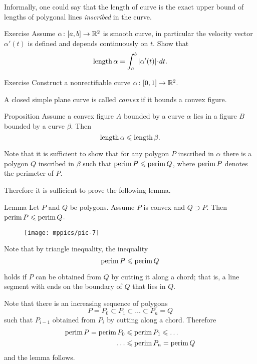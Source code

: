 Informally, one could say that the length of curve is the exact upper bound of lengths of polygonal lines \emph{inscribed} in the curve.

\begin{thm}{Exercise}
Assume $\alpha\colon[a,b]\to\mathbb{R}^2$ is smooth curve, in particular the velocity vector $\alpha'(t)$ is defined and depends continuously on $t$.
Show that
\[\length \alpha=\int_a^b|\alpha'(t)|\cdot dt.\]
\end{thm}

\begin{thm}{Exercise}\label{ex:nonrectifiable-curve}
Construct a nonrectifiable curve $\alpha\colon[0,1]\to\mathbb{R}^2$.
\end{thm}

A closed simple plane curve is called \emph{convex} if it bounds a convex figure.

\begin{thm}{Proposition}\label{prop:convex-curve}
Assume a convex figure $A$ bounded by a curve $\alpha$ lies in a figure $B$ bounded by a curve $\beta$.
Then
\[\mathop{\rm length}\nolimits\alpha\leqslant \mathop{\rm length}\nolimits\beta.\]
\end{thm}

Note that it is sufficient to show that for any polygon  $P$ inscribed in $\alpha$ there is a polygon $Q$ inscribed in $\beta$ such that 
$\mathop{\rm perim}\nolimits P\leqslant \mathop{\rm perim}\nolimits Q$, where $\mathop{\rm perim}\nolimits P$ denotes the perimeter of $P$.

Therefore it is sufficient to prove the following lemma.


\begin{thm}{Lemma}\label{lem:perimeter}
Let $P$ and $Q$ be polygons.
Assume $P$ is convex and $Q\supset P$.
Then $\mathop{\rm perim}\nolimits P\leqslant \mathop{\rm perim}\nolimits Q$.
\end{thm}


\begin{wrapfigure}{r}{24 mm}
\vskip-4mm
\centering
\texttt{[image: mppics/pic-7]}
\end{wrapfigure}

Note that by triangle inequality,
the inequality
\[\mathop{\rm perim}\nolimits P\leqslant \mathop{\rm perim}\nolimits Q\]

holds
if $P$ can be obtained from $Q$ by cutting it along a chord;
that is, a line segment with ends on the boundary of $Q$ that lies in $Q$.


Note that there is an increasing sequence of polygons 
$$P=P_0\subset P_1\subset\dots\subset P_n=Q$$
such that $P_{i-1}$ obtained from $P_{i}$ by cutting along a chord.
Therefore 
\begin{align*}
\mathop{\rm perim}\nolimits P=\mathop{\rm perim}\nolimits P_0&\leqslant\mathop{\rm perim}\nolimits P_1\leqslant\dots
\\
\dots&\leqslant\mathop{\rm perim}\nolimits P_n=\mathop{\rm perim}\nolimits Q
\end{align*}
and the lemma follows.
\qeds


